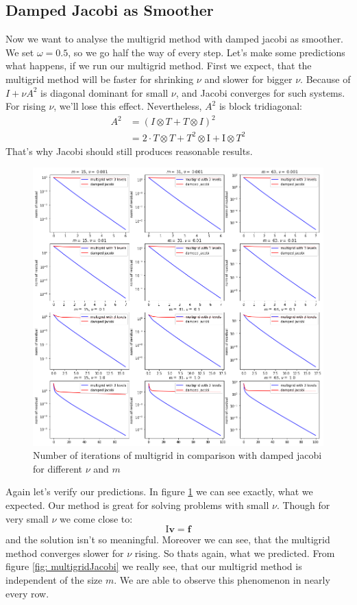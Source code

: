 \documentclass{amsart}
\theoremstyle{definition}
\theoremstyle{remark}
\numberwithin{equation}{section}
\newcommand{\Id}{\mathrm{I}}
\renewcommand{\vec}{\textbf}
\begin{document}

\subsection{Damped Jacobi as Smoother}
Now we want to analyse the multigrid method with damped jacobi as smoother. We set $\omega= 0.5$, so we go half the way of every step. Let's 
make some predictions what happens, if we run our multigrid method. First we expect, that the multigrid method will be faster for shrinking $
\nu$ and slower for bigger $\nu$. Because of $I + \nu A^2$ is diagonal dominant for small $\nu$, and Jacobi converges for such systems. For 
rising $\nu$, we'll lose this effect. Nevertheless, $A^2$ is block tridiagonal:
\begin{align*}
A^2 &= (I \otimes T + T \otimes I)^2 \\
&= 2  \cdot T \otimes T + T^2 \otimes \Id + \Id \otimes T^2 
\end{align*}
That's why Jacobi should still produces reasonable results. 
\begin{figure}[h!]
	\centering
	\includegraphics[scale=0.4]{./imgs/multigrid_jac_comparison_tiny}
	\caption{Number of iterations of multigrid in comparison with damped jacobi for different $\nu$ and $m$}
	\label{fig: multigridJacobi}
\end{figure}

Again let's verify our predictions. In figure \ref{fig: multigridJacobi} we can see exactly, what we expected. Our method is great for solving 
problems with small $\nu$. Though for very small $\nu$ we come close to:
\[
\Id   \vec{v} = \vec{f}
\] 
and the solution isn't so meaningful.
Moreover we can see, that the multigrid method converges slower for $\nu$ rising. So thats again, what we predicted. From figure \ref*{fig: 
multigridJacobi} we really see, that our multigrid method is independent of the size $m$. We are able to observe this phenomenon in nearly 
every row.
\end{document}
